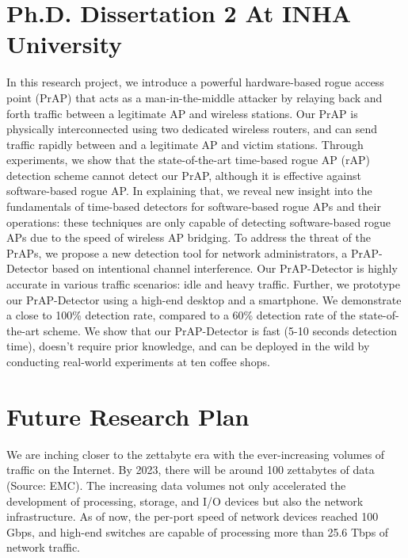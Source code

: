 \documentclass{NSF}
\begin{document}
\section{Ph.D. Dissertation 2 At INHA University}
In this research project, we introduce a powerful hardware-based rogue access point (PrAP) that acts as a man-in-the-middle attacker by relaying back and forth traffic between a legitimate AP and wireless stations. Our PrAP is physically interconnected using two dedicated wireless routers, and can send traffic rapidly between and a legitimate AP and victim stations. Through experiments, we show that the state-of-the-art time-based rogue AP (rAP) detection scheme cannot detect our PrAP, although it is effective against software-based rogue AP. In explaining that, we reveal new insight into the fundamentals of time-based detectors for software-based rogue APs and their operations: these techniques are only capable of detecting software-based rogue APs due to the speed of wireless AP bridging. To address the threat of the PrAPs, we propose a new detection tool for network administrators, a PrAP-Detector based on intentional channel interference. Our PrAP-Detector is highly accurate in various traffic scenarios: idle and heavy traffic.
Further, we prototype our PrAP-Detector using a high-end desktop and a smartphone. We demonstrate a close to 100\% detection rate, compared to a 60\% detection rate of the state-of-the-art scheme. We show that our PrAP-Detector is fast (5-10 seconds detection time), doesn't require prior knowledge, and can be deployed in the wild by conducting real-world experiments at ten coffee shops.

\section{Future Research Plan}
We are inching closer to the zettabyte era with the ever-increasing volumes of traffic on the Internet. 
By 2023, there will be around 100 zettabytes of data (Source: EMC). 
The increasing data volumes not only accelerated the development of processing, storage, and I/O devices but also the network infrastructure. As of now, the per-port speed of network devices reached 100 Gbps, and high-end switches are capable of processing more than 25.6 Tbps of network traffic. 
\end{document}

